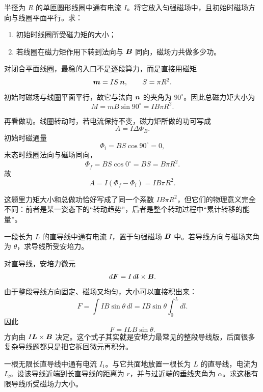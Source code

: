 \documentclass[lang=cn,11pt]{elegantbook}
\begin{document}
\begin{example}[圆形线圈在匀强磁场中的力矩与做功]
半径为 \(R\) 的单匝圆形线圈中通有电流 \(I\)。将它放入匀强磁场中，且初始时磁场方向与线圈平面平行。求：
\begin{enumerate}
  \item 初始时线圈所受磁力矩的大小；
  \item 若线圈在磁力矩作用下转到法向与 \(\vb*{B}\) 同向，磁场力共做多少功。
\end{enumerate}
\end{example}

\begin{solution}
对闭合平面线圈，最稳的入口不是逐段算力，而是直接用磁矩
\[
\vb*{m}=IS\,\vb*{n},
\qquad
S=\pi R^2.
\]
初始时磁场与线圈平面平行，故它与法向 \(\vb*{n}\) 的夹角为 \(90^\circ\)。因此总磁力矩大小为
\[
M=mB\sin 90^\circ
=IB\pi R^2.
\]

再看做功。线圈转动时，若电流保持不变，磁力矩所做的功可写成
\[
A=I\Delta\Phi_B.
\]
初始时磁通量
\[
\Phi_i=BS\cos 90^\circ=0,
\]
末态时线圈法向与磁场同向，
\[
\Phi_f=BS\cos 0^\circ=BS=B\pi R^2.
\]
故
\[
A=I(\Phi_f-\Phi_i)=IB\pi R^2.
\]

这题里力矩大小和总做功恰好写成了同一个系数 \(IB\pi R^2\)，但它们的物理意义完全不同：前者是某一姿态下的“转动趋势”，后者是整个转动过程中“累计转移的能量”。
\end{solution}

\begin{example}[长直载流导线在匀强磁场中的受力]
一段长为 \(L\) 的直导线中通有电流 \(I\)，置于匀强磁场 \(\vb*{B}\) 中。若导线方向与磁场夹角为 \(\theta\)，求导线所受安培力。
\end{example}

\begin{solution}
对直导线，安培力微元
\[
d\vb*{F}=I\,d\vb*{l}\times \vb*{B}.
\]
由于整段导线方向固定、磁场又均匀，大小可以直接积出来：
\[
F=\int I B\sin\theta\,dl
=IB\sin\theta\int_0^L dl.
\]
因此
\[
\boxed{F=ILB\sin\theta}.
\]
方向由 \(I\vb*{L}\times \vb*{B}\) 决定。这个式子其实就是安培力最常见的整段导线版，后面很多复杂导线题都只是把它拆回微元再积分。
\end{solution}

\begin{example}[有限长直导线受无限长直导线的磁场力]
一根无限长直导线中通有电流 \(I_1\)。与它共面地放置一根长为 \(L\) 的直导线，电流为 \(I_2\)。设该导线近端到长直导线的距离为 \(r\)，并与过近端的垂线夹角为 \(\alpha\)。求这根有限导线所受磁场力大小。
\end{example}
\end{document}
